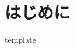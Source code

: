 \documentclass[../template.tex]{subfiles}
\begin{document}
    \section{はじめに}
        template
\end{document}
